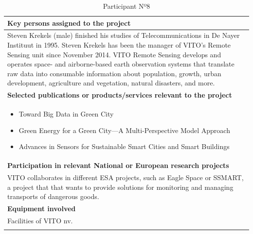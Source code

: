 \begin{longtable}[H]{|p{0.7cm}|p{4cm}|p{7cm}|p{1.3cm}|}
	\multicolumn{4}{|p{13cm}|}{\textbf{Key persons assigned to the project}}   \\ \hline
	
	\multicolumn{4}{|p{14.5cm}|}{Steven Krekels (male) finished his studies of Telecommunications in De Nayer Instituut in 1995. Steven Krekels has been the manager of VITO’s Remote Sensing unit since November 2014. VITO Remote Sensing develops and operates space- and airborne-based earth observation systems that translate raw data into consumable information about population, growth, urban development, agriculture and vegetation, natural disasters, and more.}  \\ \hline
	
	\multicolumn{4}{|p{13cm}|}{\textbf{Selected publications or products/services relevant to the project}}  \\ \hline
	
	\multicolumn{4}{|p{14.5cm}|}{
	\begin{itemize}
		\item Toward Big Data in Green City
		\item Green Energy for a Green City—A Multi-Perspective Model Approach
		\item Advances in Sensors for Sustainable Smart Cities and Smart Buildings
	\end{itemize}}  \\ \hline

	\multicolumn{4}{|p{13cm}|}{\textbf{Participation in relevant National or European research projects}}  \\ \hline
	
	\multicolumn{4}{|p{14.5cm}|}{VITO collaborates in different ESA projects, such as Eagle Space or SSMART, a project that that wants to provide solutions for monitoring and managing transports of dangerous goods.}  \\ \hline
	
	\multicolumn{4}{|p{13cm}|}{\textbf{Equipment involved}}  \\ \hline
	
	\multicolumn{4}{|p{14.5cm}|}{Facilities of VITO nv.}  \\ \hline
	\caption{Participant Nº8}
\end{longtable}